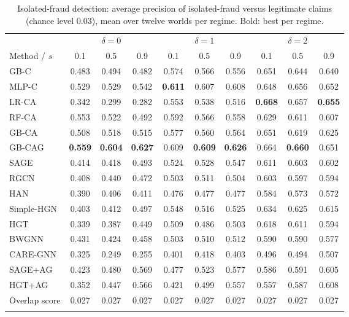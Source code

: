 \documentclass[pdflatex,sn-vancouver-num]{sn-jnl}
\begin{document}
\begin{table}[h]
\caption{Isolated-fraud detection: average precision of isolated-fraud versus legitimate claims (chance level 0.03), mean over twelve worlds per regime. Bold: best per regime.}\label{tab:regime_isoap}
\scriptsize
\setlength{\tabcolsep}{4pt}
\begin{tabular}{@{}lccccccccc@{}}
\toprule
 & \multicolumn{3}{c}{$\delta=0$} & \multicolumn{3}{c}{$\delta=1$} & \multicolumn{3}{c}{$\delta=2$} \\
\cmidrule(lr){2-4}\cmidrule(lr){5-7}\cmidrule(lr){8-10}
Method / $s$ & 0.1 & 0.5 & 0.9 & 0.1 & 0.5 & 0.9 & 0.1 & 0.5 & 0.9 \\
\midrule
GB-C & 0.483 & 0.494 & 0.482 & 0.574 & 0.566 & 0.556 & 0.651 & 0.644 & 0.640 \\
MLP-C & 0.529 & 0.529 & 0.542 & \textbf{0.611} & 0.607 & 0.608 & 0.648 & 0.656 & 0.652 \\
LR-CA & 0.342 & 0.299 & 0.282 & 0.553 & 0.538 & 0.516 & \textbf{0.668} & 0.657 & \textbf{0.655} \\
RF-CA & 0.553 & 0.522 & 0.492 & 0.592 & 0.566 & 0.558 & 0.629 & 0.611 & 0.607 \\
GB-CA & 0.508 & 0.518 & 0.515 & 0.577 & 0.560 & 0.564 & 0.651 & 0.619 & 0.625 \\
GB-CAG & \textbf{0.559} & \textbf{0.604} & \textbf{0.627} & 0.609 & \textbf{0.609} & \textbf{0.626} & 0.664 & \textbf{0.660} & 0.651 \\
\midrule
SAGE & 0.414 & 0.418 & 0.493 & 0.524 & 0.528 & 0.547 & 0.611 & 0.603 & 0.602 \\
RGCN & 0.408 & 0.440 & 0.472 & 0.503 & 0.511 & 0.504 & 0.603 & 0.597 & 0.594 \\
HAN & 0.390 & 0.406 & 0.411 & 0.476 & 0.477 & 0.477 & 0.584 & 0.573 & 0.572 \\
Simple-HGN & 0.403 & 0.412 & 0.497 & 0.548 & 0.516 & 0.525 & 0.634 & 0.625 & 0.615 \\
HGT & 0.339 & 0.387 & 0.449 & 0.509 & 0.486 & 0.503 & 0.618 & 0.611 & 0.594 \\
\midrule
BWGNN & 0.431 & 0.424 & 0.458 & 0.503 & 0.510 & 0.512 & 0.590 & 0.590 & 0.577 \\
CARE-GNN & 0.325 & 0.249 & 0.255 & 0.401 & 0.418 & 0.403 & 0.496 & 0.494 & 0.507 \\
\midrule
SAGE+AG & 0.423 & 0.480 & 0.569 & 0.477 & 0.523 & 0.577 & 0.586 & 0.591 & 0.605 \\
HGT+AG & 0.352 & 0.447 & 0.566 & 0.421 & 0.499 & 0.557 & 0.557 & 0.587 & 0.608 \\
Overlap score & 0.027 & 0.027 & 0.027 & 0.027 & 0.027 & 0.027 & 0.027 & 0.027 & 0.027 \\
\botrule
\end{tabular}
\end{table}
\end{document}
